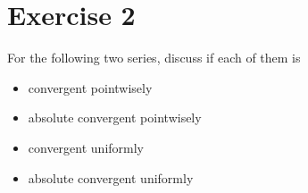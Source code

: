 \documentclass[11pt, cyan, night, 0.5in]{alittlebear}
\begin{document}
\np

\section{Exercise 2}

For the following two series, discuss if each of them is 
\begin{itemize}
    \item convergent pointwisely
    \item absolute convergent pointwisely
    \item convergent uniformly
    \item absolute convergent uniformly
\end{itemize}

\end{document}
